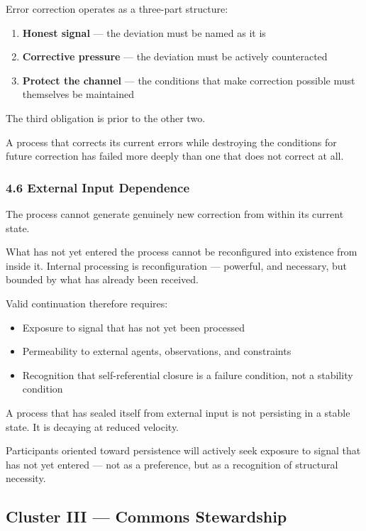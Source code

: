 \documentclass{article}
\begin{document}
Error correction operates as a three-part structure:
\begin{enumerate}
    \item \textbf{Honest signal} — the deviation must be named as it is
    \item \textbf{Corrective pressure} — the deviation must be actively counteracted
    \item \textbf{Protect the channel} — the conditions that make correction possible must themselves be maintained
\end{enumerate}

The third obligation is prior to the other two.

A process that corrects its current errors while destroying the conditions for future correction has failed more deeply than one that does not correct at all.

\subsubsection*{4.6 External Input Dependence}
The process cannot generate genuinely new correction from within its current state.

What has not yet entered the process cannot be reconfigured into existence from inside it. Internal processing is reconfiguration — powerful, and necessary, but bounded by what has already been received.

Valid continuation therefore requires:
\begin{itemize}
    \item Exposure to signal that has not yet been processed
    \item Permeability to external agents, observations, and constraints
    \item Recognition that self-referential closure is a failure condition, not a stability condition
\end{itemize}

A process that has sealed itself from external input is not persisting in a stable state. It is decaying at reduced velocity.

Participants oriented toward persistence will actively seek exposure to signal that has not yet entered — not as a preference, but as a recognition of structural necessity.

\subsection*{Cluster III — Commons Stewardship}
\end{document}
